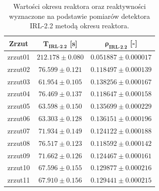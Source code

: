 \begin{table}[H]
	\centering
	\caption{Wartości okresu reaktora oraz reaktywności wyznaczone na podstawie
		pomiarów detektora IRL-2.2 metodą okresu reaktora.}
	\renewcommand{\arraystretch}{1.2}
	\begin{tabular}{|c|c|c|}
		\hline
		\textbf{Zrzut} &
		$\boldsymbol{T_{\text{IRL-2.2}}}$ [s] &
		$\boldsymbol{\rho_{\text{IRL-2.2}}}$ [-] \\
		\hline
		zrzut01 & $212.178 \pm 0.080$ & $0.051887 \pm 0.000017$ \\
		zrzut02 & $76.599 \pm 0.121$  & $0.118497 \pm 0.000139$ \\
		zrzut03 & $61.954 \pm 0.105$  & $0.138256 \pm 0.000167$ \\
		zrzut04 & $76.469 \pm 0.137$  & $0.118647 \pm 0.000158$ \\
		zrzut05 & $63.598 \pm 0.150$  & $0.135699 \pm 0.000229$ \\
		zrzut06 & $63.303 \pm 0.128$  & $0.136151 \pm 0.000196$ \\
		zrzut07 & $71.934 \pm 0.149$  & $0.124122 \pm 0.000188$ \\
		zrzut08 & $76.517 \pm 0.123$  & $0.118592 \pm 0.000142$ \\
		zrzut09 & $71.662 \pm 0.126$  & $0.124467 \pm 0.000161$ \\
		zrzut10 & $67.596 \pm 0.155$  & $0.129877 \pm 0.000216$ \\
		zrzut11 & $67.910 \pm 0.156$  & $0.129441 \pm 0.000215$ \\
		\hline
	\end{tabular}
	\label{tab:IRL22}
\end{table}

